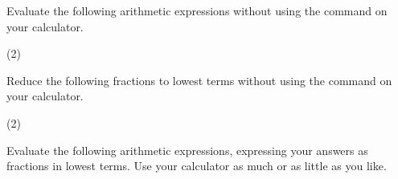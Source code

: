 Evaluate the following arithmetic expressions without using the  command on your calculator.

\begin{tasks}[label={}](2)
	\task {} 
	\task {} 
	\task {} 
	\task {} 
	\task {}  
	\task {} 
	\task {}  
	\task {} 
	\task {} 
	\task {} 
	\task{} 
	\task{}
	\task{} 
	\task{}
	\task{} 
	\task{}
	\task{} 
	\task{}
	\task{} 
	\task{}
	\task{} 
	\task{}
	\task{} 
	\task{}
	\task{} 
	\task{}
\end{tasks}

\bigskip

Reduce the following fractions to lowest terms without using the  command on your calculator.

\begin{tasks}[label={}](2)
	\task{} 
	\task{}
	\task{} 
	\task{}
\end{tasks}

\bigskip

Evaluate the following arithmetic expressions, expressing your answers as fractions in lowest terms.  Use your calculator as much or as little as you like.

